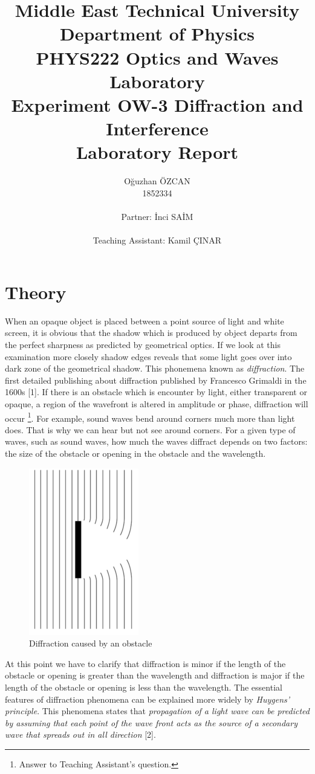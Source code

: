 \documentclass[a4paper,12pt]{report}
\title{Middle East Technical University\\Department of Physics\\PHYS222 Optics and Waves Laboratory\\\textbf{Experiment OW-3 Diffraction and Interference\\Laboratory Report}}
\author{Oğuzhan ÖZCAN\\1852334\\\\Partner: İnci SAİM\\\\Teaching Assistant: Kamil ÇINAR}
\begin{document}
\maketitle
\tableofcontents
\listoffigures
\listoftables
\chapter{Theory}
When an opaque object is placed between a point source of light and white screen, it is obvious that the shadow which is produced by object departs from the perfect sharpness as predicted by geometrical optics. If we look at this examination more closely shadow edges reveals that some light goes over into dark zone of the geometrical shadow. This phonemena known as \textit{diffraction}. The first detailed publishing about diffraction published by Francesco Grimaldi in the 1600s [1]. If there is an obstacle which is encounter by light, either transparent or opaque, a region of the wavefront is altered in amplitude or phase, diffraction will occur \footnote{Answer to Teaching Assistant's question.}.  For example, sound waves bend around corners much more than light does. That is  why we can hear but not see around corners. For a given type of waves, such as sound waves, how much the waves diffract depends on two factors: the size of the obstacle or opening in the obstacle and the wavelength. 
\begin{figure}[h!]
\centering
\includegraphics[width=0.3\linewidth, height=0.19\textheight]{obstacle}
\caption{Diffraction caused by an obstacle}
\label{fig:obstacle}
\end{figure}
At this point we have to clarify that diffraction is minor if the length of the obstacle or opening is greater than the wavelength and diffraction is major if the length of the obstacle or opening is less than the wavelength. The essential features of diffraction phenomena can be explained more widely by \textit{Huygens' principle}. This phenomena states that \textit{propagation of a light wave can be predicted by assuming that each point of the wave front acts as the source of a secondary wave that spreads out in all direction} [2]. 
\end{document}
